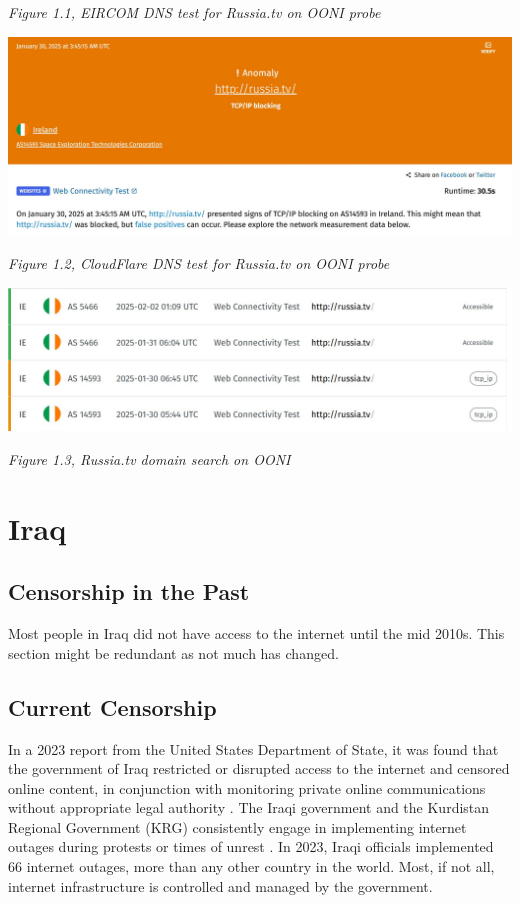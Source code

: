 \centerline{\textit{Figure 1.1, EIRCOM DNS test for Russia.tv on OONI probe}}

\centerline{\includegraphics[width=480pt]{Griff/Latex/TCD SCSS CAPSTONE/Literature Review/CloudFlare Block Russiatv.jpg}}

\centerline{\textit{Figure 1.2, CloudFlare DNS test for Russia.tv on OONI probe}}

\centerline{\includegraphics[width=480pt]{Griff/Latex/TCD SCSS CAPSTONE/Literature Review/RussiaTV search OONI.jpg}}

\centerline{\textit{Figure 1.3, Russia.tv domain search on OONI}}

\section{Iraq}

\subsection{Censorship in the Past}

Most people in Iraq did not have access to the internet until the mid 2010s. This section might be redundant as not much has changed. 

\subsection{Current Censorship}

In a 2023 report from the United States Department of State, it was found that the government of Iraq restricted or disrupted access to the internet and censored online content, in conjunction with monitoring private online communications without appropriate legal authority \cite{USDoSIraq2023}. The Iraqi government and the Kurdistan Regional Government (KRG) consistently engage in implementing internet outages during protests or times of unrest \cite{freedomhouseIraqFreedom}. In 2023, Iraqi officials implemented 66 internet outages, more than any other country in the world. Most, if not all, internet infrastructure is controlled and managed by the government. 

